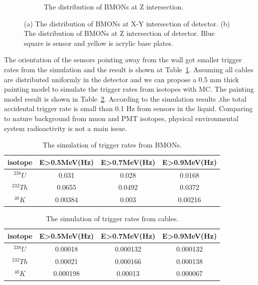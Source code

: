 \documentclass{JINST}
\begin{document}
\begin{figure}
\begin{subfigure}[b]{0.5\textwidth}
                \caption{The distribution of BMONs at Z intersection.}
                \label{fig14b}
        \end{subfigure}

        \caption{(a) The distribution of BMONs at X-Y intersection of detector. (b) The distribution of BMONs at Z intersection of detector. Blue square is sensor and yellow is acrylic base plates.  }\label{figure14}
\end{figure}

The orientation of the sensors pointing away from the wall got smaller trigger rates from the simulation and the result is shown at Table~\ref{tab2}. Assuming all cables are distributed uniformly in the detector and we can propose a 0.5 mm thick painting model to simulate the trigger rates from isotopes with MC. The painting model result is shown in Table~\ref{tab3}. According to the simulation results ,the total accidental trigger rate is small than 0.1 Hz from sensors in the liquid. Comparing to nature background from muon and PMT isotopes, physical environmental system radioactivity is not a main issue.
\begin{table}
\caption{The simulation of trigger rates from BMONs.} %
\centering  %
\begin{tabular}{c c c c} %
\hline\hline                        %
isotope& E>0.5MeV(Hz)&E>0.7MeV(Hz)&E>0.9MeV(Hz)\\ [0.5ex] %
\hline                  %
$^{238}U$ & 0.031&0.028&0.0168    \\ %
$^{232}Th$  &0.0655   &0.0492 &0.0372 \\
$^{40}K$  & 0.00384 &0.003 & 0.00216\\ [1ex]      %
\hline %
\end{tabular}
\label{tab2} %
\end{table}
\begin{table}
\caption{The simulation of trigger rates from cables.} %
\centering  %
\begin{tabular}{c c c c} %
\hline\hline                        %
isotope& E>0.5MeV(Hz)&E>0.7MeV(Hz)&E>0.9MeV(Hz)\\ [0.5ex] %
\hline                  %
$^{238}U$ & 0.00018&0.000132&0.000132    \\ %
$^{232}Th$  &0.00021   &0.000166 &0.000138 \\
$^{40}K$  & 0.000198 &0.00013 & 0.000067\\ [1ex]      %
\hline %
\end{tabular}
\label{tab3} %
\end{table}
\end{document}
